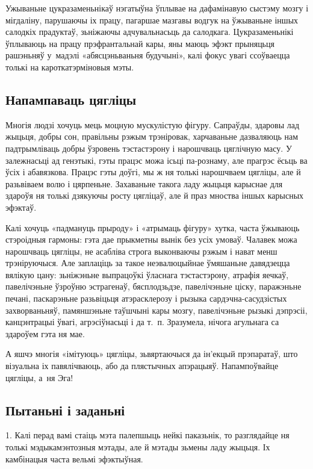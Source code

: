 Ужываньне цукразаменьнікаў нэгатыўна ўплывае на дафамінавую сыстэму мозгу і мігдаліну, парушаючы іх працу, пагаршае мазгавы водгук на ўжываньне іншых салодкіх прадуктаў, зьніжаючы адчувальнасьць да салодкага. Цукразаменьнікі ўплываюць на працу прэфрантальнай кары, яны маюць эфэкт прыняцьця рашэньняў у~мадэлі «абясцэньваньня будучыні», калі фокус увагі ссоўваецца толькі на кароткатэрміновыя мэты.

\subsection*{Напампаваць цягліцы}

Многія людзі хочуць мець моцную мускулістую фігуру. Сапраўды, здаровы лад жыцьця, добры сон, правільны рэжым трэніровак, харчаваньне дазваляюць нам падтрымліваць добры ўзровень тэстастэрону і нарошчваць цяглічную масу. У залежнасьці ад генэтыкі, гэты працэс можа ісьці па-рознаму, але прагрэс ёсьць ва ўсіх і абавязкова. Працэс гэты доўгі, мы ж ня толькі нарошчваем цягліцы, але й разьвіваем волю і цярпеньне. Захаваньне такога ладу жыцьця карыснае для здароўя ня толькі дзякуючы росту цягліцаў, але й праз мноства іншых карысных эфэктаў.

Калі хочуць «падмануць прыроду» і «атрымаць фігуру» хутка, часта ўжываюць стэроідныя гармоны: гэта дае прыкметны вынік без усіх умоваў. Чалавек можа нарошчваць цягліцы, не асабліва строга выконваючы рэжым і нават менш трэніруючыся. Але заплаціць за такое неэвалюцыйнае ўмяшаньне давядзецца вялікую цану: зьніжэньне выпрацоўкі ўласнага тэстастэрону, атрафія яечкаў, павелічэньне ўзроўню эстрагенаў, бясплодзьдзе, павелічэньне ціску, паражэньне печані, паскарэньне разьвіцьця атэрасклерозу і рызыка сардэчна-сасудзістых захворваньняў, памяншэньне таўшчыні кары мозгу, павелічэньне рызыкі дэпрэсіі, канцэнтрацыі ўвагі, агрэсіўнасьці і да т.~п. Зразумела, нічога агульнага са здароўем гэта ня мае.

А яшчэ многія «імітуюць» цягліцы, зьвяртаючыся да ін'екцый прэпаратаў, што візуальна іх павялічваюць, або да плястычных апэрацыяў. Напампоўвайце цягліцы, а~ня Эга!

\subsection*{Пытаньні і заданьні}

1. Калі перад вамі стаіць мэта палепшыць нейкі паказьнік, то разглядайце ня толькі мэдыкамэнтозныя мэтады, але й мэтады зьмены ладу жыцьця. Іх камбінацыя часта вельмі эфэктыўная.


